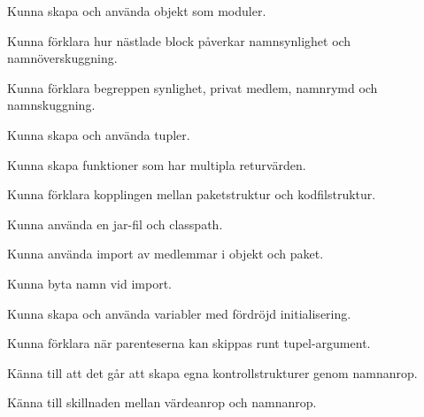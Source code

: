 
\item Kunna skapa och använda objekt som moduler.
\item Kunna förklara hur nästlade block påverkar namnsynlighet och namnöverskuggning.
\item Kunna förklara begreppen synlighet, privat medlem, namnrymd och namnskuggning.

\item Kunna skapa och använda tupler.
\item Kunna skapa funktioner som har multipla returvärden.

\item Kunna förklara kopplingen mellan paketstruktur och kodfilstruktur.
\item Kunna använda en jar-fil och classpath.

\item Kunna använda import av medlemmar i objekt och paket.
\item Kunna byta namn vid import.

\item Kunna skapa och använda variabler med fördröjd initialisering.
\item Kunna förklara när parenteserna kan skippas runt tupel-argument.

\item Känna till att det går att skapa egna kontrollstrukturer genom namnanrop.
\item Känna till skillnaden mellan värdeanrop och namnanrop.
